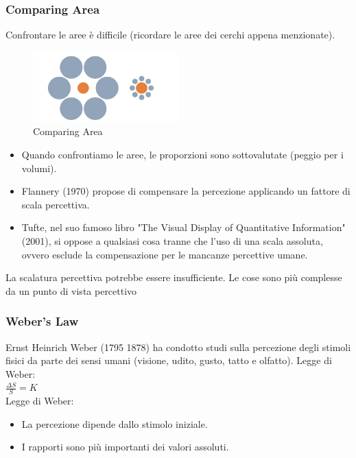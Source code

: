   \subsubsection{Comparing Area}
  Confrontare le aree è difficile (ricordare le aree dei cerchi appena menzionate).
  \begin{figure}[H]
    \centering
    \includegraphics[width=0.5\textwidth]{images/Comparing.png} 
    \caption{Comparing Area}
    \label{fig:immagine}
\end{figure} 
    \begin{itemize}
        \item Quando confrontiamo le aree, le proporzioni sono sottovalutate (peggio per i volumi).
        \item Flannery (1970) propose di compensare la percezione applicando un fattore di scala percettiva.
        \item Tufte, nel suo famoso libro "The Visual Display of Quantitative Information" (2001), si oppose a qualsiasi cosa tranne che l'uso di una scala assoluta, ovvero esclude la compensazione per le mancanze percettive umane.
    \end{itemize}
    La scalatura percettiva potrebbe essere insufficiente. Le cose sono più complesse da un punto di vista percettivo
\subsubsection{Weber's Law}
Ernst Heinrich Weber (1795 1878) ha condotto studi sulla percezione degli stimoli fisici da parte dei sensi umani (visione, udito, gusto, tatto e olfatto).
Legge di Weber: \\
$ \frac{\Delta S}{S}=K $ \\

Legge di Weber:
\begin{itemize}
    \item La percezione dipende dallo stimolo iniziale.
    \item  I rapporti sono più importanti dei valori assoluti.
\end{itemize}

